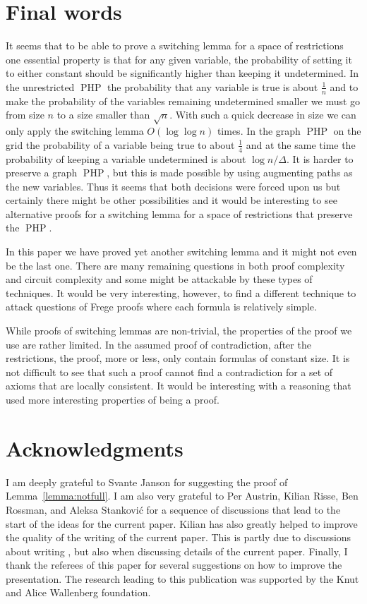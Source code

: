 \documentclass{article}\usepackage[a4paper,margin=20mm]{geometry}
\DeclareMathOperator{\PHP}{PHP}
\begin{document}
\section{Final words}\label{sec:conclusion}

It seems that to be able to prove a switching lemma for a
space of restrictions one essential property is that for any
given variable, the probability of setting it to either constant
should be significantly higher than keeping it undetermined.
In the unrestricted $\PHP$ the probability that any variable is true is 
about $\frac 1n$ and to make the probability of the variables
remaining undetermined smaller we must go from size $n$ to a size
smaller than $\sqrt n$.  With such a quick decrease in
size we can only apply the switching lemma $O (\log \log n)$
times.  In the graph $\PHP$ on the grid the
probability of a variable being true to about $\frac 14$
and at the same time the probability of keeping a variable
undetermined is about $\log n/\Delta$.
It is harder to preserve a graph $\PHP$, but this is 
made possible by using augmenting paths as the new
variables.  Thus it seems that both decisions were forced
upon us but certainly there might be other possibilities and
it would be interesting to see alternative proofs for a
switching lemma for a space of restrictions that preserve
the $\PHP$.

In this paper we have proved yet another switching lemma and 
it might not even be the last one.  There are many remaining
questions in both proof complexity and circuit complexity 
and some might be attackable by these types of techniques.
It would be very interesting, however, to find a different
technique to attack questions of Frege proofs where each
formula is relatively simple.

While proofs of switching lemmas are non-trivial, the 
properties of the proof we use are rather limited.
In the assumed proof of contradiction, after the
restrictions, the proof, more or less, only contain formulas of constant
size.  It is not difficult to see that such
a proof cannot find a contradiction for 
a set of axioms that are locally consistent.  
It would be interesting with a reasoning that used
more interesting properties of being a proof.

\section*{Acknowledgments}  

I am deeply grateful to
Svante Janson for suggesting the proof of Lemma~\ref{lemma:notfull}.
I am also very grateful to Per Austrin, Kilian Risse, Ben Rossman,
and Aleksa Stankovi\'c
for a sequence of discussions that lead to the start of the
ideas for the current paper.  
Kilian has also greatly helped to improve the quality of the writing
of the current paper.  This is partly due to discussions about
writing \cite{jhkr}, but also when discussing details of
the current paper.
Finally, I thank the referees of
this paper for several suggestions on how to improve the 
presentation.
The research leading to this publication
was supported by the Knut
and Alice Wallenberg foundation.  
\end{document}
